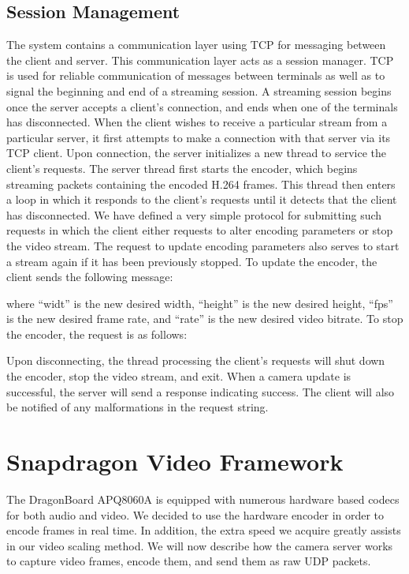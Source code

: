 \documentclass[a4paper,12pt]{article}
\begin{document}
\subsection{Session Management}

The system contains a communication layer using TCP for messaging between the client and server. This communication layer acts as a session manager. TCP is used for reliable communication of messages between terminals as well as to signal the beginning and end of a streaming session. A streaming session begins once the server accepts a client's connection, and ends when one of the terminals has disconnected. When the client wishes to receive a particular stream from a particular server, it first attempts to make a connection with that server via its TCP client. Upon connection, the server initializes a new thread to service the client’s requests. The server thread first starts the encoder, which begins streaming packets containing the encoded H.264 frames. This thread then enters a loop in which it responds to the client's requests until it detects that the client has disconnected. We have defined a very simple protocol for submitting such requests in which the client either requests to alter encoding parameters or stop the video stream. The request to update encoding parameters also serves to start a stream again if it has been previously stopped. To update the encoder, the client sends the following message:

where ``widt'' is the new desired width, ``height'' is the new desired height, ``fps'' is the new desired frame rate, and ``rate'' is the new desired video bitrate. To stop the encoder, the request is as follows:

Upon disconnecting, the thread processing the client's requests will shut down the encoder, stop the video stream, and exit. When a camera update is successful, the server will send a response indicating success. The client will also be notified of any malformations in the request string.


\section{Snapdragon Video Framework}
\label{sec:Snapdragon}

The DragonBoard APQ8060A is equipped with numerous hardware based codecs for both audio and video. We decided to use the hardware encoder in order to encode frames in real time. In addition, the extra speed we acquire greatly assists in our video scaling method. We will now describe how the camera server works to capture video frames, encode them, and send them as raw UDP packets.
\end{document}
